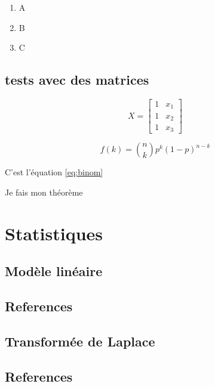 \documentclass[]{book}
\providecommand{\tightlist}{%
  \setlength{\itemsep}{0pt}\setlength{\parskip}{0pt}}
\theoremstyle{definition}
\theoremstyle{definition}
\theoremstyle{definition}
\theoremstyle{remark}
\let\BeginKnitrBlock\begin \let\EndKnitrBlock\end
\begin{document}
\begin{enumerate}
\def\labelenumi{\arabic{enumi}.}
\tightlist
\item
  A
\item
  B
\item
  C
\end{enumerate}

\chapter{tests avec des matrices}\label{tests-avec-des-matrices}

\[X = \begin{bmatrix}1 & x_{1}\\
1 & x_{2}\\
1 & x_{3}
\end{bmatrix}\]

\begin{equation} 
  f\left(k\right) = \binom{n}{k} p^k\left(1-p\right)^{n-k}
  \label{eq:binom}
\end{equation}

C'est l'équation \eqref{eq:binom}

\BeginKnitrBlock{theorem}
\protect\hypertarget{thm:unnamed-chunk-1}{}{\label{thm:unnamed-chunk-1} }Je
fais mon théorème
\EndKnitrBlock{theorem}

\part{Statistiques}\label{part-statistiques}

\chapter{Modèle linéaire}\label{modele-lineaire}

\chapter{References}\label{references}

\appendix


\chapter{Transformée de Laplace}\label{transformee-de-laplace}

\chapter{References}\label{references-1}


\end{document}
